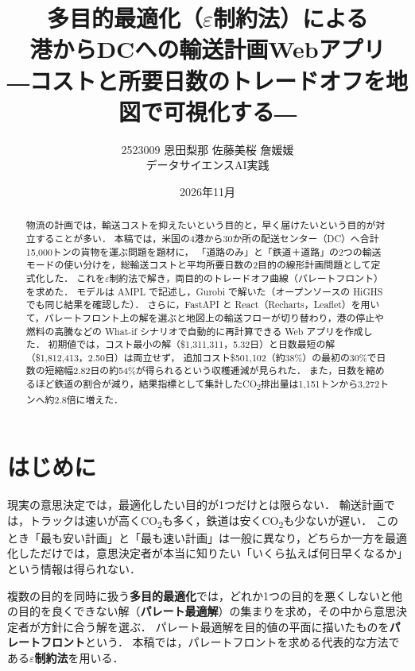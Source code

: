 \documentclass[a4paper,11pt]{ltjsarticle}
\title{多目的最適化（$\varepsilon$制約法）による\\港からDCへの輸送計画Webアプリ\\[0.5ex]
\large ―コストと所要日数のトレードオフを地図で可視化する―}
\author{2523009 恩田梨那\quad 2523019 佐藤美桜\quad 2523023 詹媛媛\\[0.5ex]
\normalsize データサイエンスAI実践}
\date{2026年11月}
\newcommand{\COO}{CO\textsubscript{2}}
\begin{document}
\maketitle

\begin{abstract}
物流の計画では，輸送コストを抑えたいという目的と，早く届けたいという目的が対立することが多い．
本稿では，米国の4港から30か所の配送センター（DC）へ合計15,000トンの貨物を運ぶ問題を題材に，
「道路のみ」と「鉄道＋道路」の2つの輸送モードの使い分けを，総輸送コストと平均所要日数の2目的の線形計画問題として定式化した．
これを$\varepsilon$制約法で解き，両目的のトレードオフ曲線（パレートフロント）を求めた．
モデルは AMPL で記述し，Gurobi で解いた（オープンソースの HiGHS でも同じ結果を確認した）．
さらに，FastAPI と React（Recharts，Leaflet）を用いて，パレートフロント上の解を選ぶと地図上の輸送フローが切り替わり，港の停止や燃料の高騰などの What-if シナリオで自動的に再計算できる Web アプリを作成した．
初期値では，コスト最小の解（\$1,311,311，5.32日）と日数最短の解（\$1,812,413，2.50日）は両立せず，
追加コスト\$501,102（約38\%）の最初の30\%で日数の短縮幅2.82日の約54\%が得られるという収穫逓減が見られた．
また，日数を縮めるほど鉄道の割合が減り，結果指標として集計した\COO{}排出量は1,151トンから3,272トンへ約2.8倍に増えた．
\end{abstract}

\section{はじめに}
現実の意思決定では，最適化したい目的が1つだけとは限らない．
輸送計画では，トラックは速いが高く\COO{}も多く，鉄道は安く\COO{}も少ないが遅い．
このとき「最も安い計画」と「最も速い計画」は一般に異なり，どちらか一方を最適化しただけでは，意思決定者が本当に知りたい「いくら払えば何日早くなるか」という情報は得られない．

複数の目的を同時に扱う\textbf{多目的最適化}では，どれか1つの目的を悪くしないと他の目的を良くできない解（\textbf{パレート最適解}）の集まりを求め，その中から意思決定者が方針に合う解を選ぶ\cite{miettinen1999,chankong1983}．
パレート最適解を目的値の平面に描いたものを\textbf{パレートフロント}という．
本稿では，パレートフロントを求める代表的な方法である\textbf{$\varepsilon$制約法}\cite{haimes1971}を用いる．
\end{document}
